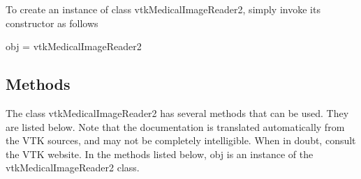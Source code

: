 To create an instance of class vtk\-Medical\-Image\-Reader2, simply invoke its constructor as follows \begin{DoxyVerb}  obj = vtkMedicalImageReader2
\end{DoxyVerb}
 \hypertarget{vtkwidgets_vtkxyplotwidget_Methods}{}\subsection{Methods}\label{vtkwidgets_vtkxyplotwidget_Methods}
The class vtk\-Medical\-Image\-Reader2 has several methods that can be used. They are listed below. Note that the documentation is translated automatically from the V\-T\-K sources, and may not be completely intelligible. When in doubt, consult the V\-T\-K website. In the methods listed below, {\ttfamily obj} is an instance of the vtk\-Medical\-Image\-Reader2 class. 
